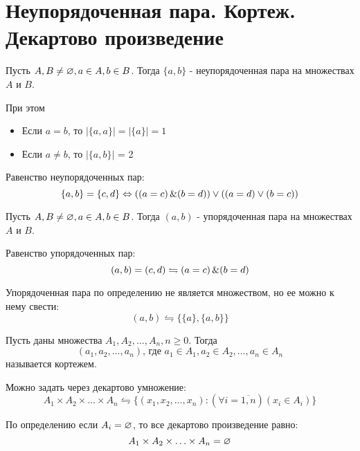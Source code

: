 

\title{}
\author{Козырнов Александр Дмитриевич, ИУ7-32Б}
\date{\today}


\section{Неупорядоченная пара. Кортеж. Декартово произведение}

\begin{definition}
Пусть $A,B \neq \varnothing, a \in A, b \in B$. Тогда $\{a,b\} $ - неупорядоченная пара
на множествах $A$ и  $B$.
\end{definition}

\medskip

При этом
\begin{itemize}
	\item Если $a=b$, то  $ \left| \{a,a\}  \right| = \left| \{a\}  \right| = 1$ 
	\item Если $a\neq b$, то $\left| \{a,b\}  \right| $ = 2
\end{itemize}

Равенство неупорядоченных пар:
\[
\{a,b\} = \{c,d\} \Leftrightarrow ((a=c)\operatorname{\&}(b=d))\lor((a=d)\lor(b=c))   
\] 
\begin{definition}
Пусть $A,B\neq \varnothing, a \in A, b \in B$. Тогда $(a,b)$ - упорядоченная пара на
множествах  $A$ и  $B$.
\end{definition}

Равенство упорядоченных пар: \[
	(a,b) = (c,d) \leftrightharpoons (a = c)\operatorname{\&}(b=d)
\]

\medskip

Упорядоченная пара по определению не является множеством, но ее можно к нему свести: \[
	(a,b) \leftrightharpoons \{\{a\}, \{a,b\} \} 
\]
\medskip

\begin{definition}
Пусть даны множества $A_1,A_2,\ldots,A_{n}, n\ge 0$. Тогда
\[
	(a_1,a_2,\ldots,a_{n})\text{, где } a_1 \in A_1, a_2 \in A_2,\ldots,a_n \in A_n
\]
называется кортежем.
\end{definition}

\medskip

Можно задать через декартово умножение:
\[
A_1\times A_2\times \ldots\times A_n \leftrightharpoons \{(x_1,x_2,\ldots,x_{n}):
(\forall i=\overline{1,n})(x_{i} \in A_i)\} 
\] 

\medskip

По определению если $A_i = \varnothing$, то все декартово произведение равно:
 \[
A_1\times A_2\times \ldots\times A_n = \varnothing
\] 


